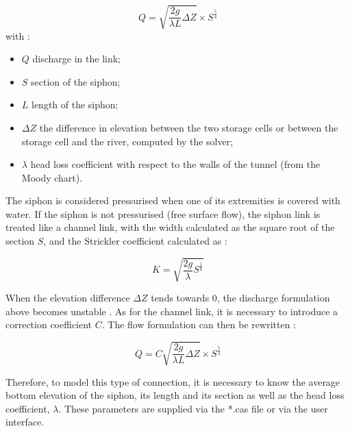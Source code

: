 \begin{equation}
 Q = \sqrt{\frac{2 g}{\lambda L}\Delta Z} \times S^{\frac{5}{4}}
\end{equation}
with :
\begin{itemize}
 \item $Q$ discharge in the link;
 \item $S$ section of the siphon;
 \item $L$ length of the siphon;
 \item $\Delta Z$ the difference in elevation between the two storage cells or between the storage cell and the river, computed by the solver;
 \item $\lambda$ head loss coefficient with respect to the walls of the tunnel (from the Moody chart).
\end{itemize}

\vspace{0.5cm}

The siphon is considered pressurised when one of its extremities is covered with water. If the siphon is not pressurised (free surface flow), the siphon link is treated like a channel link, with the width calculated as the square root of the section $S$, and the Strickler coefficient calculated as :

\begin{equation}
 K = \sqrt{\frac{2 g}{\lambda} S^{\frac{1}{6}}}
\end{equation}

\vspace{0.5cm}

When the elevation difference $\Delta Z$ tends towards $0$, the discharge formulation above becomes unstable \cite{RISSOAN02}. As for the channel link, it is necessary to introduce a correction coefficient $C$. The flow formulation can then be rewritten :

\begin{equation}
 Q = C \sqrt{\frac{2 g}{\lambda L}\Delta Z} \times S^{\frac{5}{4}}
\end{equation}

\vspace{0.5cm}

Therefore, to model this type of connection, it is necessary to know the average bottom elevation of the siphon, its length and its section as well as the head loss coefficient, $\lambda$. These parameters are supplied via the *.cas file or via the user interface.

\vspace{0.5cm}

